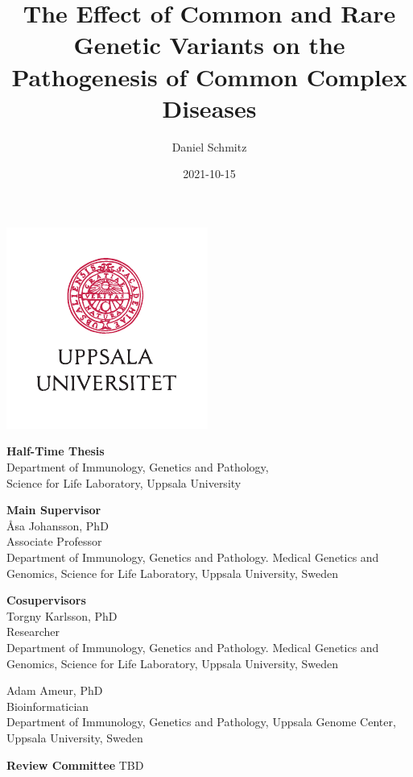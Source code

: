 \documentclass[]{scrbook}
\title{The Effect of Common and Rare Genetic Variants on the Pathogenesis of Common Complex Diseases}
\author{Daniel Schmitz}
\date{2021-10-15}
\begin{document}
\frontmatter

\begin{titlepage}
    \centering
    \makeatletter
    \LARGE \sffamily \@title

    \Large \rmfamily \@author

    \vspace*{\fill}
    \includegraphics[width=.5\pagewidth]{img/UU_logo_4f_42.pdf}

    \vspace*{\fill}
    \normalsize
    \textbf{Half-Time Thesis} \\
    Department of Immunology, Genetics and Pathology,\\
    Science for Life Laboratory, Uppsala University

    \@date
    \makeatother
\end{titlepage}

\textbf{Main Supervisor}\\
Åsa Johansson, PhD\\
Associate Professor \\
Department of Immunology, Genetics and Pathology. Medical Genetics and Genomics, Science for Life Laboratory, Uppsala University, Sweden

\textbf{Cosupervisors}\\
Torgny Karlsson, PhD\\
Researcher \\
Department of Immunology, Genetics and Pathology. Medical Genetics and Genomics, Science for Life Laboratory, Uppsala University, Sweden

Adam Ameur, PhD \\
Bioinformatician \\
Department of Immunology, Genetics and Pathology, Uppsala Genome Center, Uppsala University, Sweden

\textbf{Review Committee}
TBD
\end{document}
